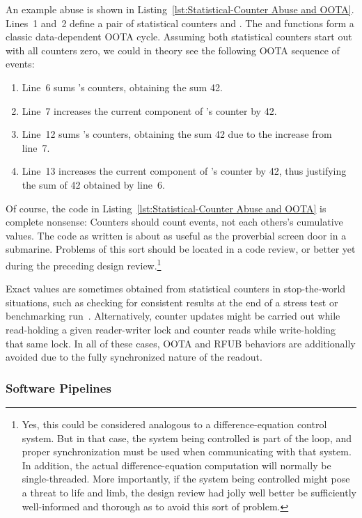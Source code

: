 \documentclass[10]{article}
\begin{document}
An example abuse is shown in
Listing~\ref{lst:Statistical-Counter Abuse and OOTA}.
Lines~1 and~2 define a pair of statistical counters  and .
The  and  functions form a classic
data-dependent OOTA cycle.
Assuming both statistical counters start out with all counters zero,
we could in theory see the following OOTA sequence of events:

\begin{enumerate}
\item	Line~6 sums 's counters, obtaining the sum 42.
\item	Line~7 increases the current component of 's counter by 42.
\item	Line~12 sums 's counters, obtaining the sum 42 due to the
	increase from line~7.
\item	Line~13 increases the current component of 's counter by 42,
	thus justifying the sum of 42 obtained by line~6.
\end{enumerate}

Of course, the code in
Listing~\ref{lst:Statistical-Counter Abuse and OOTA}
is complete nonsense: Counters should count events, not each others's
cumulative values.
The code as written is about as useful as the proverbial screen door in
a submarine.
Problems of this sort should be located in a code review, or better yet
during the preceding design review.\footnote{
	Yes, this could be considered analogous to a difference-equation
	control system.
	But in that case, the system being controlled is part of the
	loop, and proper synchronization must be used when communicating
	with that system.
	In addition, the actual difference-equation computation will
	normally be single-threaded.
	More importantly, if the system being controlled might pose a threat
	to life and limb, the design review had jolly well better be
	sufficiently well-informed and thorough as to avoid this sort
	of problem.}

Exact values are sometimes obtained from statistical counters in
stop-the-world situations, such as checking for consistent results
at the end of a stress test or benchmarking
run~\cite[Sections 5.3 and 5.4]{McKenney2018ParallelProgramming-2018-12-08a}.
Alternatively, counter updates might be carried out while read-holding
a given reader-writer lock and counter reads while write-holding
that same lock.
In all of these cases, OOTA and RFUB behaviors are additionally avoided due
to the fully synchronized nature of the readout.

\subsubsection{Software Pipelines}
\label{sec:Software Pipelines}
\end{document}
